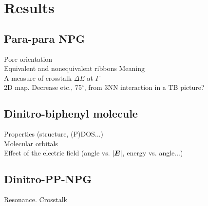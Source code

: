 
\chapter{Results}

\label{ch4}

\section{Para-para NPG}
Pore orientation\\
Equivalent and nonequivalent ribbons
Meaning\\
A measure of crosstalk \(\Delta E\) at \(\Gamma\)\\
2D map. Decrease etc., 75\(^{\circ}\), from 3NN interaction in a TB picture?


\section{Dinitro-biphenyl molecule}
Properties (structure, (P)DOS...)\\
Molecular orbitals\\
Effect of the electric field (angle vs. \(\abs{\bm E}\), energy vs. angle...)


\section{Dinitro-PP-NPG}
Resonance. Crosstalk

